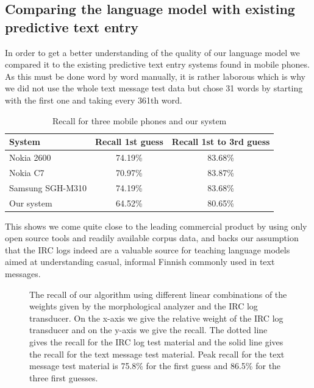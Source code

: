 \documentclass[a4paper,conference]{IEEEtran}
\begin{document}
\subsection{Comparing the language model with existing predictive text entry}

In order to get a better understanding of the quality of our language model we compared it to the existing predictive text entry systems found in mobile phones. As this must be done word by word manually, it is rather laborous which is why we did not use the whole text message test data but chose 31 words by starting with the first one and taking every 361th word.

\begin{table}[!t]
\begin{center}
\caption{Recall for three mobile phones and our system}
\begin{tabular} {l c c}
System & Recall 1st guess & Recall 1st to 3rd guess\\
\hline
Nokia 2600 \rule{0pt}{2.6ex}  & 74.19\%          & 83.68\%\\
Nokia C7     & 70.97\%          & 83.87\%\\
Samsung SGH-M310 & 74.19\%      & 83.68\%\\
Our system & 64.52\% & 80.65\%  \\
\hline
\end{tabular}
\end{center}
\label{tab:phones}
\end{table}

This shows we come quite close to the leading commercial product by using only open source tools and readily available corpus data, and backs our assumption that the IRC logs indeed are a valuable source for teaching language models aimed at understanding casual, informal Finnish commonly used in text messages.


\begin{figure}[!t]
\centerline{
\hfil
{}}
\caption{The recall of our algorithm using different linear combinations of the weights given by the morphological analyzer and the IRC log transducer. On the x-axis we give the relative weight of the IRC log transducer and on the y-axis we give the recall. The dotted line gives the recall for the IRC log test material and the solid line gives the recall for the text message test material. Peak recall for the text message test material is 75.8\% for the first guess and 86.5\% for the three first guesses.}
\label{fig:AccuraciesIRCMaterial}
\end{figure}
\end{document}
